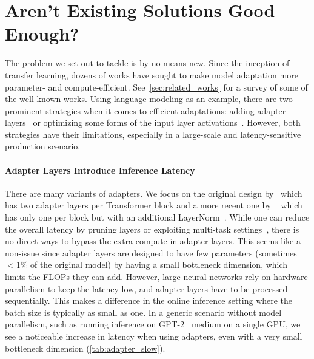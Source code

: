 \section{Aren't Existing Solutions Good Enough?}
\label{sec:existing_solutions_no_good}

The problem we set out to tackle is by no means new.
Since the inception of transfer learning, dozens of works have sought to make model adaptation more parameter- and compute-efficient.
See~\autoref{sec:related_works} for a survey of some of the well-known works.
Using language modeling as an example, there are two prominent strategies when it comes to efficient adaptations: adding adapter layers~\citep{houlsby_parameter-efficient_2019, rebuffi_learning_2017, pfeiffer2021adapterfusion, ruckle2020adapterdrop} or optimizing some forms of the input layer activations~\citep{li_prefix-tuning_2021, lester_power_2021, hambardzumyan_warp_2020, liu_gpt_2021}.
However, both strategies have their limitations, especially in a large-scale and latency-sensitive production scenario.

\paragraph{Adapter Layers Introduce Inference Latency}
There are many variants of adapters.
We focus on the original design by~\citet{houlsby_parameter-efficient_2019} which has two adapter layers per Transformer block and a more recent one by ~\citet{lin-etal-2020-exploring} which has only one per block but with an additional LayerNorm~\citep{ba2016layer}.
While one can reduce the overall latency by pruning layers or exploiting multi-task settings~\citep{ruckle2020adapterdrop,pfeiffer2021adapterfusion}, there is no direct ways to bypass the extra compute in adapter layers.
This seems like a non-issue since adapter layers are designed to have few parameters (sometimes $<$1\% of the original model) by having a small bottleneck dimension, which limits the FLOPs they can add.
However, large neural networks rely on hardware parallelism to keep the latency low, and adapter layers have to be processed sequentially.
This makes a difference in the online inference setting where the batch size is typically as small as one.
In a generic scenario without model parallelism, such as running inference on GPT-2~\citep{radford_language_nodate} medium on a single GPU, we see a noticeable increase in latency when using adapters, even with a very small bottleneck dimension (\autoref{tab:adapter_slow}).



